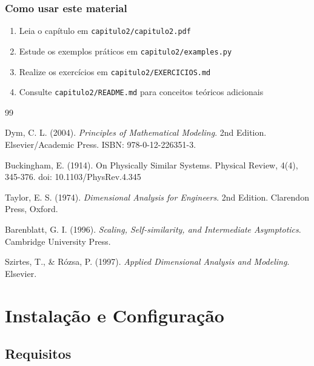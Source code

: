 \documentclass[12pt,a4paper,oneside]{book}
\begin{document}
\subsection*{Como usar este material}

\begin{enumerate}
    \item Leia o capítulo em \texttt{capitulo2/capitulo2.pdf}
    \item Estude os exemplos práticos em \texttt{capitulo2/examples.py}
    \item Realize os exercícios em \texttt{capitulo2/EXERCICIOS.md}
    \item Consulte \texttt{capitulo2/README.md} para conceitos teóricos adicionais
\end{enumerate}

\backmatter

\begin{thebibliography}{99}

Dym, C. L. (2004).
\textit{Principles of Mathematical Modeling}.
2nd Edition.
Elsevier/Academic Press.
ISBN: 978-0-12-226351-3.

Buckingham, E. (1914).
On Physically Similar Systems.
Physical Review, 4(4), 345-376.
doi: 10.1103/PhysRev.4.345

Taylor, E. S. (1974).
\textit{Dimensional Analysis for Engineers}.
2nd Edition.
Clarendon Press, Oxford.

Barenblatt, G. I. (1996).
\textit{Scaling, Self-similarity, and Intermediate Asymptotics}.
Cambridge University Press.

Szirtes, T., \& Rózsa, P. (1997).
\textit{Applied Dimensional Analysis and Modeling}.
Elsevier.

\end{thebibliography}

\appendix

\chapter{Instalação e Configuração}

\section{Requisitos}
\end{document}
